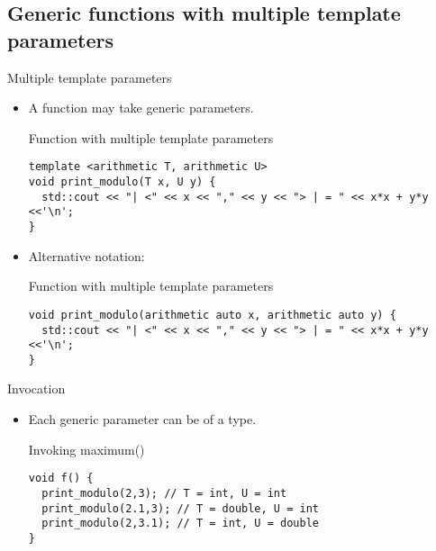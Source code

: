 \subsection{Generic functions with multiple template parameters}

\begin{frame}[t,fragile]{Multiple template parameters}
\begin{itemize}
  \item A function may take  generic parameters.

\begin{block}{Function with multiple template parameters}
\begin{lstlisting}
template <arithmetic T, arithmetic U>
void print_modulo(T x, U y) {
  std::cout << "| <" << x << "," << y << "> | = " << x*x + y*y <<'\n';
}
\end{lstlisting}
\end{block}

  \item Alternative notation:

\begin{block}{Function with multiple template parameters}
\begin{lstlisting}
void print_modulo(arithmetic auto x, arithmetic auto y) {
  std::cout << "| <" << x << "," << y << "> | = " << x*x + y*y <<'\n';
}
\end{lstlisting}
\end{block}

\end{itemize}
\end{frame}

\begin{frame}[t,fragile]{Invocation}
\begin{itemize}
  \item Each generic parameter can be of a  type.

\begin{block}{Invoking maximum()}
\begin{lstlisting}
void f() {
  print_modulo(2,3); // T = int, U = int
  print_modulo(2.1,3); // T = double, U = int
  print_modulo(2,3.1); // T = int, U = double
}
\end{lstlisting}
\end{block}

\end{itemize}
\end{frame}
